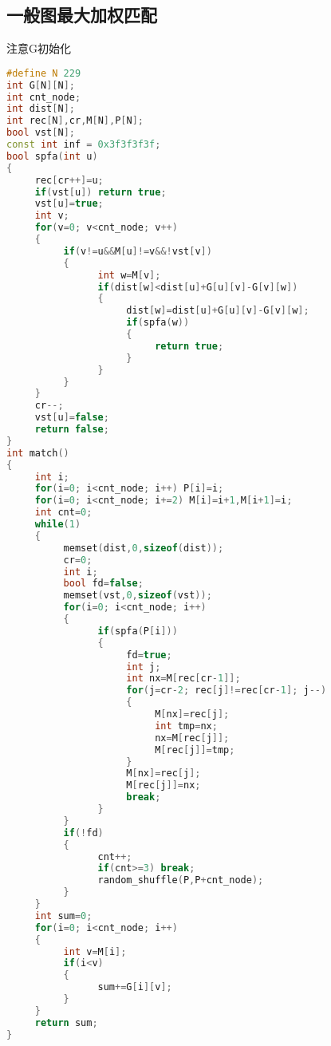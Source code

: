 \subsection{一般图最大加权匹配}
	 注意G初始化\\
	 \begin{lstlisting}[language=c++]
#define N 229
int G[N][N];
int cnt_node;
int dist[N];
int rec[N],cr,M[N],P[N];
bool vst[N];
const int inf = 0x3f3f3f3f;
bool spfa(int u)
{
	 rec[cr++]=u;
	 if(vst[u]) return true;
	 vst[u]=true;
	 int v;
	 for(v=0; v<cnt_node; v++)
	 {
		  if(v!=u&&M[u]!=v&&!vst[v])
		  {
				int w=M[v];
				if(dist[w]<dist[u]+G[u][v]-G[v][w])
				{
					 dist[w]=dist[u]+G[u][v]-G[v][w];
					 if(spfa(w))
					 {
						  return true;
					 }
				}
		  }
	 }
	 cr--;
	 vst[u]=false;
	 return false;
}
int match()
{
	 int i;
	 for(i=0; i<cnt_node; i++) P[i]=i;
	 for(i=0; i<cnt_node; i+=2) M[i]=i+1,M[i+1]=i;
	 int cnt=0;
	 while(1)
	 {
		  memset(dist,0,sizeof(dist));
		  cr=0;
		  int i;
		  bool fd=false;
		  memset(vst,0,sizeof(vst));
		  for(i=0; i<cnt_node; i++)
		  {
				if(spfa(P[i]))
				{
					 fd=true;
					 int j;
					 int nx=M[rec[cr-1]];
					 for(j=cr-2; rec[j]!=rec[cr-1]; j--)
					 {
						  M[nx]=rec[j];
						  int tmp=nx;
						  nx=M[rec[j]];
						  M[rec[j]]=tmp;
					 }
					 M[nx]=rec[j];
					 M[rec[j]]=nx;
					 break;
				}
		  }
		  if(!fd)
		  {
				cnt++;
				if(cnt>=3) break;
				random_shuffle(P,P+cnt_node);
		  }
	 }
	 int sum=0;
	 for(i=0; i<cnt_node; i++)
	 {
		  int v=M[i];
		  if(i<v)
		  {
				sum+=G[i][v];
		  }
	 }
	 return sum;
}
	 \end{lstlisting}
